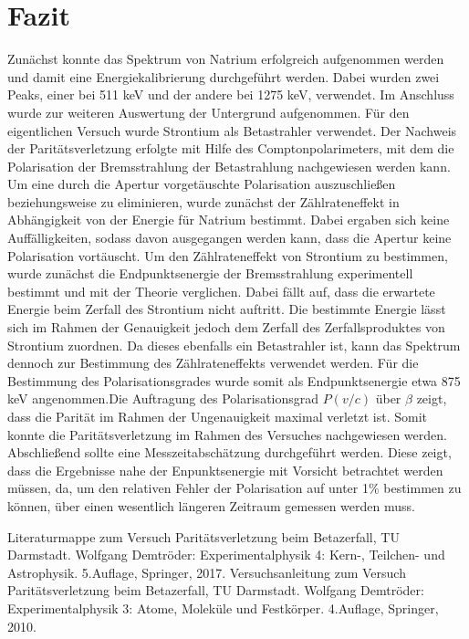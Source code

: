 \documentclass[twoside,colorback,accentcolor=tud4c,11pt]{tudreport}
\begin{document}
\chapter{Fazit}
Zunächst konnte das Spektrum von Natrium erfolgreich aufgenommen werden und damit eine Energiekalibrierung durchgeführt werden. Dabei wurden zwei Peaks, einer bei 511 keV und der andere bei 1275 keV, verwendet. Im Anschluss wurde zur weiteren Auswertung der Untergrund aufgenommen. Für den eigentlichen Versuch wurde Strontium als Betastrahler verwendet. Der Nachweis der Paritätsverletzung erfolgte mit Hilfe des Comptonpolarimeters, mit dem die Polarisation der Bremsstrahlung der Betastrahlung nachgewiesen werden kann. Um eine durch die Apertur vorgetäuschte Polarisation auszuschließen beziehungsweise zu eliminieren, wurde zunächst der Zählrateneffekt in Abhängigkeit von der Energie für Natrium bestimmt. Dabei ergaben sich keine Auffälligkeiten, sodass davon ausgegangen werden kann, dass die Apertur keine Polarisation vortäuscht. Um den Zählrateneffekt von Strontium zu bestimmen, wurde zunächst die Endpunktsenergie der Bremsstrahlung experimentell bestimmt und mit der Theorie verglichen. Dabei fällt auf, dass die erwartete Energie beim Zerfall des Strontium nicht auftritt. Die bestimmte Energie lässt sich im Rahmen der Genauigkeit jedoch dem Zerfall des Zerfallsproduktes von Strontium zuordnen. Da dieses ebenfalls ein Betastrahler ist, kann das Spektrum dennoch zur Bestimmung des Zählrateneffekts verwendet werden. Für die Bestimmung des Polarisationsgrades wurde somit als Endpunktsenergie etwa 875 keV angenommen.Die Auftragung des Polarisationsgrad $P(v/c)$ über $\beta$ zeigt, dass die Parität im Rahmen der Ungenauigkeit maximal verletzt ist. Somit konnte die Paritätsverletzung im Rahmen des Versuches nachgewiesen werden. Abschließend sollte eine Messzeitabschätzung durchgeführt werden. Diese zeigt, dass die Ergebnisse nahe der Enpunktsenergie mit Vorsicht betrachtet werden müssen, da, um den relativen Fehler der Polarisation auf unter 1\% bestimmen zu können, über einen wesentlich längeren Zeitraum gemessen werden muss.



		

\renewcommand{\bibname}{Literaturverzeichnis}
\begin{thebibliography}{Bak89}
 Literaturmappe zum Versuch Paritätsverletzung beim Betazerfall, TU Darmstadt.
 Wolfgang Demtröder: Experimentalphysik 4: Kern-, Teilchen- und Astrophysik. 5.Auflage, Springer, 2017.
 Versuchsanleitung zum Versuch Paritätsverletzung beim Betazerfall, TU Darmstadt.
 Wolfgang Demtröder: Experimentalphysik 3: Atome, Moleküle und Festkörper. 4.Auflage, Springer, 2010.




\end{thebibliography} 	
\end{document}
